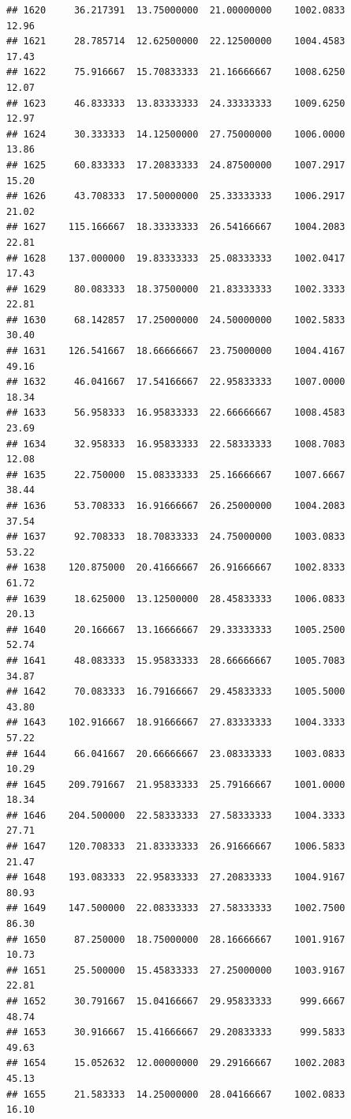 \documentclass[
]{article}
\begin{document}
\begin{verbatim}
## 1620     36.217391  13.75000000  21.00000000    1002.0833       12.96
## 1621     28.785714  12.62500000  22.12500000    1004.4583       17.43
## 1622     75.916667  15.70833333  21.16666667    1008.6250       12.07
## 1623     46.833333  13.83333333  24.33333333    1009.6250       12.97
## 1624     30.333333  14.12500000  27.75000000    1006.0000       13.86
## 1625     60.833333  17.20833333  24.87500000    1007.2917       15.20
## 1626     43.708333  17.50000000  25.33333333    1006.2917       21.02
## 1627    115.166667  18.33333333  26.54166667    1004.2083       22.81
## 1628    137.000000  19.83333333  25.08333333    1002.0417       17.43
## 1629     80.083333  18.37500000  21.83333333    1002.3333       22.81
## 1630     68.142857  17.25000000  24.50000000    1002.5833       30.40
## 1631    126.541667  18.66666667  23.75000000    1004.4167       49.16
## 1632     46.041667  17.54166667  22.95833333    1007.0000       18.34
## 1633     56.958333  16.95833333  22.66666667    1008.4583       23.69
## 1634     32.958333  16.95833333  22.58333333    1008.7083       12.08
## 1635     22.750000  15.08333333  25.16666667    1007.6667       38.44
## 1636     53.708333  16.91666667  26.25000000    1004.2083       37.54
## 1637     92.708333  18.70833333  24.75000000    1003.0833       53.22
## 1638    120.875000  20.41666667  26.91666667    1002.8333       61.72
## 1639     18.625000  13.12500000  28.45833333    1006.0833       20.13
## 1640     20.166667  13.16666667  29.33333333    1005.2500       52.74
## 1641     48.083333  15.95833333  28.66666667    1005.7083       34.87
## 1642     70.083333  16.79166667  29.45833333    1005.5000       43.80
## 1643    102.916667  18.91666667  27.83333333    1004.3333       57.22
## 1644     66.041667  20.66666667  23.08333333    1003.0833       10.29
## 1645    209.791667  21.95833333  25.79166667    1001.0000       18.34
## 1646    204.500000  22.58333333  27.58333333    1004.3333       27.71
## 1647    120.708333  21.83333333  26.91666667    1006.5833       21.47
## 1648    193.083333  22.95833333  27.20833333    1004.9167       80.93
## 1649    147.500000  22.08333333  27.58333333    1002.7500       86.30
## 1650     87.250000  18.75000000  28.16666667    1001.9167       10.73
## 1651     25.500000  15.45833333  27.25000000    1003.9167       22.81
## 1652     30.791667  15.04166667  29.95833333     999.6667       48.74
## 1653     30.916667  15.41666667  29.20833333     999.5833       49.63
## 1654     15.052632  12.00000000  29.29166667    1002.2083       45.13
## 1655     21.583333  14.25000000  28.04166667    1002.0833       16.10

\end{verbatim}
\end{document}
